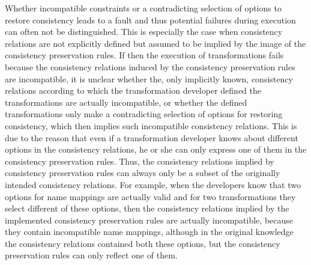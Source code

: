 Whether incompatible constraints or a contradicting selection of options to restore consistency leads to a fault and thus potential failures during execution can often not be distinguished.
This is especially the case when consistency relations are not explicitly defined but assumed to be implied by the image of the consistency preservation rules.
If then the execution of transformations fails because the consistency relations induced by the consistency preservation rules are incompatible, it is unclear whether the, only implicitly known, consistency relations according to which the transformation developer defined the transformations are actually incompatible, or whether the defined transformations only make a contradicting selection of options for restoring consistency, which then implies such incompatible consistency relations.
This is due to the reason that even if a transformation developer knows about different options in the consistency relations, he or she can only express one of them in the consistency preservation rules.
Thus, the consistency relations implied by consistency preservation rules can always only be a subset of the originally intended consistency relations.
For example, when the developers know that two options for name mappings are actually valid and for two transformations they select different of these options, then the consistency relations implied by the implemented consistency preservation rules are actually incompatible, because they contain incompatible name mappings, although in the original knowledge the consistency relations contained both these options, but the consistency preservation rules can only reflect one of them.

